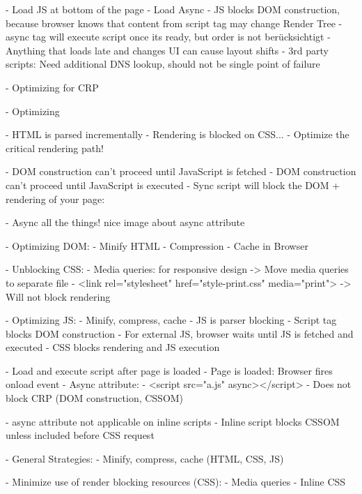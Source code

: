 - Load JS at bottom of the page
- Load Async
- JS blocks DOM construction, because browser knows that content from script tag may change Render Tree
- async tag will execute script once its ready, but order is not berücksichtigt
- Anything that loads late and changes UI can cause layout shifts
- 3rd party scripts: Need additional DNS lookup, should not be single point of failure


- Optimizing for CRP


- Optimizing


-  HTML is parsed incrementally
- Rendering is blocked on CSS...
- Optimize the critical rendering path!

- DOM construction can't proceed until JavaScript is fetched
- DOM construction can't proceed until JavaScript is executed
- Sync script will block the DOM + rendering of your page:

- Async all the things! nice image about async attribute


- Optimizing DOM:
	- Minify HTML
	- Compression
	- Cache in Browser


- Unblocking CSS:
	- Media queries: for responsive design
	-> Move media queries to separate file
	- <link rel="stylesheet" href="style-print.css" media="print">
	-> Will not block rendering


- Optimizing JS:
	- Minify, compress, cache
	- JS is parser blocking
	- Script tag blocks DOM construction
	- For external JS, browser waits until JS is fetched and executed
	- CSS blocks rendering and JS execution

	- Load and execute script after page is loaded
	- Page is loaded: Browser fires onload event
	- Async attribute:
		- <script src="a.js" async></script>
		- Does not block CRP (DOM construction, CSSOM)

	- async attribute not applicable on inline scripts
	- Inline script blocks CSSOM unless included before CSS request


- General Strategies:
	- Minify, compress, cache (HTML, CSS, JS)

	- Minimize use of render blocking resources (CSS):
		- Media queries
		- Inline CSS

